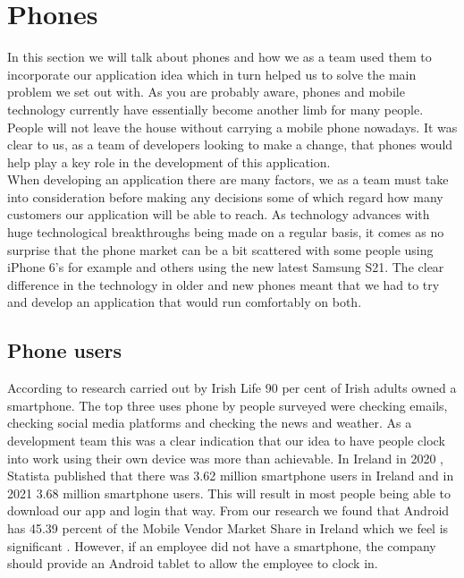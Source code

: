 \section{Phones}
In this section we will talk about phones and how we as a team used them to incorporate our application idea which in turn helped us to solve the main problem we set out with. As you are probably aware, phones and mobile technology currently have essentially become another limb for many people. People will not leave the house without carrying a mobile phone nowadays. It was clear to us, as a team of developers looking to make a change, that phones would help play a key role in the development of this application.
\\
When developing an application there are many factors, we as a team must take into consideration before making any decisions some of which regard how many customers our application will be able to reach. As technology advances with huge technological breakthroughs being made on a regular basis, it comes as no surprise that the phone market can be a bit scattered with some people using iPhone 6’s for example and others using the new latest Samsung S21. The clear difference in the technology in older and new phones meant that we had to try and develop an application that would run comfortably on both.
\\
\subsection{Phone users}
According to research carried out by Irish Life \cite{smartPhoneUsage} 90 per cent of Irish adults owned a smartphone. The top three uses phone by people surveyed were checking emails, checking social media platforms and checking the news and weather. As a development team this was a clear indication that our idea to have people clock into work using their own device was more than achievable. In Ireland in 2020 \cite{Statista}, Statista published that there was 3.62 million smartphone users in Ireland and in 2021 3.68 million smartphone users. This will result in most people being able to download our app and login that way. From our research we found that Android has 45.39 percent of the  Mobile Vendor Market Share in Ireland which we feel is significant \cite{Mobile}. However, if an employee did not have a smartphone, the company should provide an Android tablet to allow the employee to clock in.
\\
